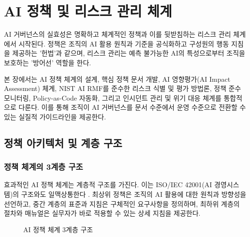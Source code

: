 
\chapter{AI 정책 및 리스크 관리 체계}
\label{ch:policy_risk}

AI 거버넌스의 실효성은 명확하고 체계적인 정책과 이를 뒷받침하는 리스크 관리 체계에서 시작된다. 정책은 조직의 AI 활용 원칙과 기준을 공식화\cite{schneider2022governance}하고 구성원의 행동 지침을 제공하는 '헌법'과 같으며, 리스크 관리는 예측 불가능한 AI의 특성으로부터 조직을 보호하는 '방어선' 역할을 한다.

본 장에서는 AI 정책 체계의 설계, 핵심 정책 문서 개발, AI 영향평가\cite{raji2020closing}(AI Impact Assessment) 체계, NIST AI RMF\cite{iso23894}를 준수한 리스크 식별 및 평가 방법론, 정책 준수\cite{mokander2022conformity} 모니터링\cite{klaise2021monitoring}, Policy-as-Code\cite{hinrichs2019opa} 자동화, 그리고 인시던트 관리\cite{brundage2020trustworthy} 및 위기 대응 체계를 통합적으로 다룬다. 이를 통해 조직이 AI 거버넌스를 문서 수준에서 운영 수준으로 전환할 수 있는 실질적 가이드라인을 제공한다.

\section{정책 아키텍처 및 계층 구조}
\label{sec:5.1}

\subsection{정책 체계의 3계층 구조}
\label{sec:5.1.1}

효과적인 AI 정책 체계는 계층적 구조를 가진다. 이는 ISO/IEC 42001(AI 경영시스템)의 구조와도 일맥상통한다 \cite{iso42001}. 최상위 정책은 조직의 AI 활용에 대한 원칙과 방향성을 선언하고, 중간 계층의 표준과 지침은 구체적인 요구사항을 정의하며, 최하위 계층의 절차와 매뉴얼은 실무자가 바로 적용할 수 있는 상세 지침을 제공한다.

\begin{figure}[htbp]
\centering
{}
\caption{AI 정책 체계 3계층 구조}
\label{fig:policy_hierarchy}
\end{figure}


